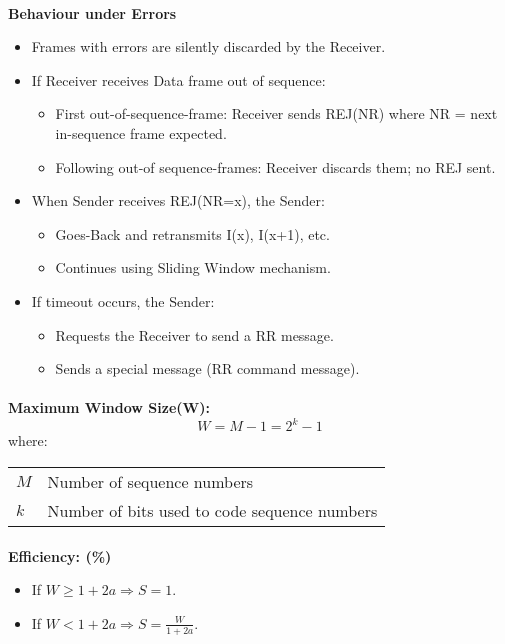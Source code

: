 \documentclass[../resumosRCOM.tex]{subfiles}
\makeatletter
\newenvironment{conditions}
  {\par\vspace{\abovedisplayskip}\noindent\begin{tabular}{>{$}l<{$} @{${}={}$} l}}
  {\end{tabular}\par\vspace{\belowdisplayskip}}
\makeatother
\begin{document}
\paragraph{}
\textbf{Behaviour under Errors}
\begin{itemize}
    \item Frames with errors are silently discarded by the Receiver.
    \item If Receiver receives Data frame out of sequence:
    \begin{itemize}
        \item First out-of-sequence-frame: Receiver sends REJ(NR) where NR =
        next in-sequence frame expected.
        \item Following out-of sequence-frames: Receiver discards them; no REJ
        sent.                
    \end{itemize}
    \item When Sender receives REJ(NR=x), the Sender:
    \begin{itemize}
        \item Goes-Back and retransmits I(x), I(x+1), etc.
        \item Continues using Sliding Window mechanism.
    \end{itemize}
    \item If timeout occurs, the Sender:
    \begin{itemize}
        \item Requests the Receiver to send a RR message.
        \item Sends a special message (RR command message).
    \end{itemize}
\end{itemize}


\paragraph{}
\textbf{Maximum Window Size(W):} 
\begin{equation}
    {W}= {M - 1} = {2^{k} - 1}
\end{equation}
where:
\begin{conditions}
    M & Number of sequence numbers\\
    k & Number of bits used to code sequence numbers \\
\end{conditions}

\paragraph{}
\textbf{Efficiency: (\%)}
\begin{itemize}
    \item If $W \geq 1 + 2a \Rightarrow S = 1$.
    \item If $W < 1 + 2a \Rightarrow S = \frac{W}{1 + 2a}$.
\end{itemize}
\end{document}
